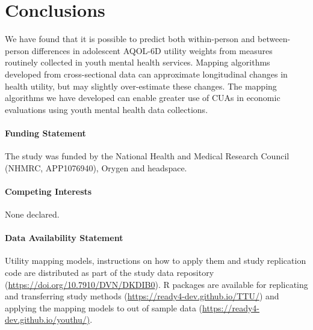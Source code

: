 \documentclass[
  journal=largetwo,
  manuscript=original-article,
  year=2023-Submission,
]{cup-journal}
\begin{document}
\section{Conclusions}

We have found that it is possible to predict both within-person and between-person differences in adolescent AQOL-6D utility weights from measures routinely collected in youth mental health services. Mapping algorithms developed from cross-sectional data can approximate longitudinal changes in health utility, but may slightly over-estimate these changes. The mapping algorithms we have developed can enable greater use of CUAs in economic evaluations using youth mental health data collections.

\paragraph{Funding Statement}

The study was funded by the National Health and Medical Research Council (NHMRC, APP1076940), Orygen and headspace.

\paragraph{Competing Interests}

None declared.

\paragraph{Data Availability Statement}

Utility mapping models, instructions on how to apply them and study replication code are distributed as part of the study data repository (\url{https://doi.org/10.7910/DVN/DKDIB0}). R packages are available for replicating and transferring study methods (\url{https://ready4-dev.github.io/TTU/}) and applying the mapping models to out of sample data (\url{https://ready4-dev.github.io/youthu/)}.

\printendnotes

\printbibliography

\clearpage

\appendix
\end{document}
